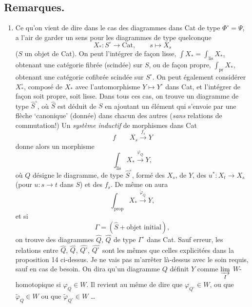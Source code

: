 \documentclass[11pt]{article}
\newcommand{\printedpage}[1]{\marginpar{\footnotesize p.~#1}}
\newcommand{\msp}[1]{\marginpar{\footnotesize [#1]}}
\newcommand{\Cat}{\mathrm{Cat}}
\newcommand{\tld}{^{\tilde{}}}
\begin{document}
\subsection*{Remarques.}

\begin{enumerate}
\item[1)] Ce qu'on vient de dire dans le cas des diagrammes dans Cat de type $\Phi^\circ = \Psi$, a l'air de garder un sens pour les diagrammes de type quelconque
\[
X_* : S^\circ \longrightarrow \Cat, \qquad s \longmapsto X_s
\]
\printedpage{99}
($S$ un objet de Cat). On peut l'intégrer de façon lisse, $\int X_* = \int_{\mathrm{lis}} X_*$, obtenant une catégorie fibrée (scindée) sur $S$, ou de façon propre, $\int_{\mathrm{pr}} X_*$, obtenant une catégorie cofibrée scindée sur $S^\circ$. On peut également considérer $X_*^\circ$, composé de $X_*$ avec l'automorphisme $Y \longmapsto Y^\circ$ dans Cat, et l'intégrer de façon soit propre, soit lisse. Dans tous ces cas, on trouve un diagramme de type $\widehat{S}^\circ$, où $\widehat{S}$ est déduit de $S$ en ajoutant un élément qui s'envoie par une flèche ‘canonique’ (donnée) dans chacun des autres (\textit{sans} relations de commutation!) Un
\msp{page 144}\textit{système inductif} de morphismes dans Cat
\[
f \qquad X_s \xrightarrow{f_s} Y
\]
donne alors un morphisme
\[
\int_{\mathrm{lis}} X_* \xrightarrow{\varphi_Q} Y,
\]
où $Q$ désigne le diagramme, de type $\widehat{S}^\circ$, formé des $X_s$, de $Y$, des $u^* : X_t \longrightarrow X_s$ (pour $u : s \longrightarrow t$ dans $S$) et des $f_s$. De même on aura
\[
\int_{\mathrm{prop}} X_* \xrightarrow{\tilde{\varphi}_Q} Y,
\]
et si
\[
\Gamma = (\widehat{S} + \text{objet initial}),
\]
on trouve des diagrammes $\widehat{Q}$, $\widehat{Q}\tld$ de type $\Gamma^\circ$ dans Cat. Sauf erreur, les relations entre $\widehat{Q}$, $\widehat{Q}\tld$, $\widehat{Q^\circ}$, $\widehat{Q^\circ}\tld$ sont les mêmes que celles explicitées dans la proposition 14 ci-dessus. Je ne vais pas m'arrêter là-dessus avec le soin requis, sauf en cas de besoin. On dira qu'un diagramme $Q$ définit $Y$ comme $\varinjlim\limits_{I}$ $W$-homotopique si $\varphi_Q \in W$. Il revient au même de dire que $\varphi_{Q^\circ} \in W$, ou que $\tilde{\varphi}_Q \in W$ ou que $\tilde{\varphi}_{Q^\circ} \in W$ \dots
\msp{page 145}


\end{enumerate}
\end{document}
